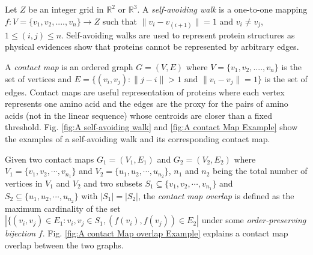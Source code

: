 Let $Z$ be an integer grid in $\mathbb{R}^2$ or $\mathbb{R}^3$. A \emph{self-avoiding walk} is a one-to-one mapping $f:V =\{v_1,v_2,....,v_n\}\rightarrow Z$ such that $\|v_i - v_{(i+1)}\| = 1$ and $v_i \ne v_j$, $1 \leq (i,j) \leq n$. Self-avoiding walks are used to represent protein structures as physical evidences show that proteins cannot be represented by arbitrary edges.

A {\it contact map} is an ordered graph $G = (V,E)$ where $V = \{v_1,v_2,....,v_n\}$ is the set of vertices and $E = \{(v_i, v_j): \|j-i\| >1 \text{ and } \|v_i - v_j\| =1\}$ is the set of edges. Contact maps are useful representation of proteins where each vertex represents one amino acid and the edges are the proxy for the pairs of amino acids (not in the linear sequence) whose centroids are closer than a fixed threshold. Fig. \ref{fig:A self-avoiding walk} and \ref{fig:A contact Map Example} show the examples of a self-avoiding walk and its corresponding contact map.

Given two contact maps $G_1=(V_1,E_1)$ and $G_2=(V_2,E_2)$ where $V_1=\{v_1,v_2,\cdots,v_{n_1}\}$ and $V_2=\{u_1,u_2,\cdots,u_{n_2}\}$, $n_1$ and $n_2$ being the total number of vertices in $V_1$ and $V_2$ and two subsets $S_1 \subseteq \{v_1,v_2,\cdots,v_{n_1}\}$ and $S_2 \subseteq \{u_1,u_2,\cdots,u_{n_2}\}$ with $|S_1| = |S_2|$, the \emph{contact map overlap} is defined as the maximum cardinality of the set $|\{(v_i,v_j) \in E_1 : v_i,v_j \in S_1, (f(v_i), f(v_j)) \in E_2|$ under some {\it order-preserving bijection} $f$. Fig. \ref{fig:A contact Map overlap Example} explains a contact map overlap between the two graphs. 